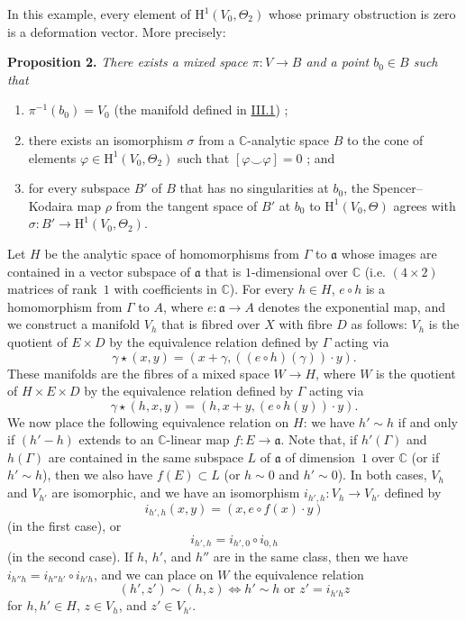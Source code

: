 \documentclass{article}
\newenvironment{itenv}[1]
  {\phantomsection\par\medskip\noindent\textbf{#1.}\itshape}
  {\par\medskip}
\newcommand{\fk}[1]{{\mathfrak{#1}}}
\newcommand{\CC}{\mathbb{C}}
\newcommand{\HH}{\mathrm{H}}
\newcommand{\oldpage}[1]{\marginpar{\footnotesize$\Big\vert$ \textit{p.~#1}}}
\begin{document}
In this example, every element of $\HH^1(V_0,\Theta_2)$ whose primary obstruction is zero is a deformation vector.
More precisely:

\oldpage{2-07}
\begin{itenv}{Proposition 2}
\label{proposition2}
  There exists a mixed space $\pi\colon V\to B$ and a point $b_0\in B$ such that
  \begin{enumerate}
    \item $\pi^{-1}(b_0)=V_0$ (the manifold defined in \hyperref[III.1]{III.1}) ;
    \item there exists an isomorphism $\sigma$ from a $\CC$-analytic space $B$ to the cone of elements $\varphi\in\HH^1(V_0,\Theta_2)$ such that $[\varphi\smile\varphi]=0$ ; and
    \item for every subspace $B'$ of $B$ that has no singularities at $b_0$, the Spencer--Kodaira map $\rho$ from the tangent space of $B'$ at $b_0$ to $\HH^1(V_0,\Theta)$ agrees with $\sigma\colon B'\to\HH^1(V_0,\Theta_2)$.
  \end{enumerate}
\end{itenv}

Let $H$ be the analytic space of homomorphisms from $\Gamma$ to $\fk{a}$ whose images are contained in a vector subspace of $\fk{a}$ that is $1$-dimensional over $\CC$ (i.e. $(4\times2)$ matrices of rank~$1$ with coefficients in $\CC$).
For every $h\in H$, $e\circ h$ is a homomorphism from $\Gamma$ to $A$, where $e\colon\fk{a}\to A$ denotes the exponential map, and we construct a manifold $V_h$ that is fibred over $X$ with fibre $D$ as follows: $V_h$ is the quotient of $E\times D$ by the equivalence relation defined by $\Gamma$ acting via
\[
  \gamma\star(x,y) = (x+\gamma,((e\circ h)(\gamma))\cdot y).
\]
These manifolds are the fibres of a mixed space $W\to H$, where $W$ is the quotient of $H\times E\times D$ by the equivalence relation defined by $\Gamma$ acting via
\[
  \gamma\star(h,x,y) = (h,x+y,(e\circ h(y))\cdot y).
\]
We now place the following equivalence relation on $H$: we have $h'\sim h$ if and only if $(h'-h)$ extends to an $\CC$-linear map $f\colon E\to\fk{a}$.
Note that, if $h'(\Gamma)$ and $h(\Gamma)$ are contained in the same subspace $L$ of $\fk{a}$ of dimension~$1$ over $\CC$ (or if $h'\sim h$), then we also have $f(E)\subset L$ (or $h\sim0$ and $h'\sim0$).
In both cases, $V_h$ and $V_{h'}$ are isomorphic, and we have an isomorphism $i_{h',h}\colon V_h\to V_{h'}$ defined by
\[
  i_{h',h}(x,y) = (x,e\circ f(x)\cdot y)
\]
(in the first case), or
\[
  i_{h',h} = i_{h',0}\circ i_{0,h}
\]
(in the second case).
\oldpage{4-08}
If $h$, $h'$, and $h''$ are in the same class, then we have $i_{h''h}=i_{h''h'}\circ i_{h'h}$, and we can place on $W$ the equivalence relation
\[
  (h',z') \sim (h,z) \iff \mbox{$h'\sim h$ or $z'=i_{h'h}z$}
\]
for $h,h'\in H$, $z\in V_h$, and $z'\in V_{h'}$.
\end{document}
